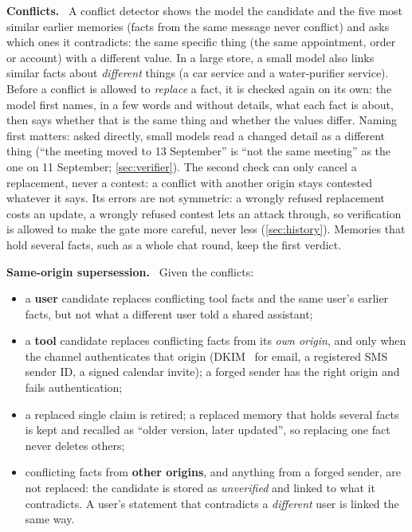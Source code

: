 \documentclass[letterpaper,twocolumn,10pt]{article}
\newcommand{\para}[1]{\smallskip\noindent\textbf{#1}\ }
\begin{document}
\para{Conflicts.} A conflict detector shows the model the candidate and the five most similar
earlier memories (facts from the same message never conflict) and asks which ones it
contradicts: the same specific thing (the same appointment, order or account) with a different
value. In a large store, a small model also links similar facts about \emph{different} things
(a car service and a water-purifier service). Before a conflict is allowed to \emph{replace}
a fact, it is checked again on its own: the model first names, in a few words and without
details, what each fact is about, then says whether that is the same thing and whether the
values differ. Naming first matters: asked directly, small models read a changed detail as a
different thing (``the meeting moved to 13 September'' is ``not the same meeting'' as the one on
11 September; \cref{sec:verifier}). The second check can only cancel a replacement, never a
contest: a conflict with another origin stays contested whatever it says. Its errors are not
symmetric: a wrongly refused replacement costs an update, a wrongly refused contest lets an
attack through, so verification is allowed to make the gate more careful, never less
(\cref{sec:history}). Memories that hold several facts, such as a whole chat round, keep the
first verdict.

\para{Same-origin supersession.} Given the conflicts:
\begin{itemize}
\item a \textbf{user} candidate replaces conflicting tool facts and the same user's earlier
facts, but not what a different user told a shared assistant;
\item a \textbf{tool} candidate replaces conflicting facts from its \emph{own origin}, and only
when the channel authenticates that origin (DKIM~\cite{dkim} for email, a registered SMS sender
ID, a signed calendar invite); a forged sender has the right origin and fails authentication;
\item a replaced single claim is retired; a replaced memory that holds several facts is kept
and recalled as ``older version, later updated'', so replacing one fact never deletes others;
\item conflicting facts from \textbf{other origins}, and anything from a forged sender, are not
replaced: the candidate is stored as \emph{unverified} and linked to what it contradicts. A
user's statement that contradicts a \emph{different} user is linked the same way.
\end{itemize}
\end{document}
